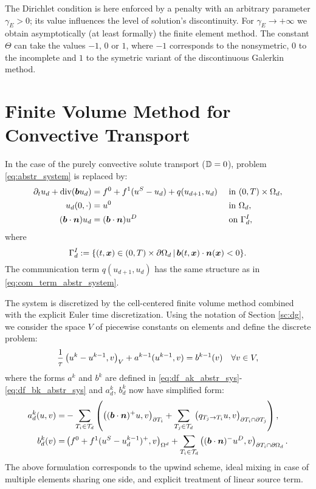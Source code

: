 The Dirichlet condition is here enforced by a penalty with an arbitrary parameter $\gamma_E>0$;
 its value influences the level of solution's discontinuity.
For $\gamma_E\to+\infty$ we obtain asymptotically (at least formally) the finite element method.
The constant $\Theta$ can take the values $-1$, $0$ or $1$,
 where $-1$ corresponds to the nonsymetric, $0$ to the incomplete and $1$ to the symetric variant of the discontinuous Galerkin method.




\section{Finite Volume Method for Convective Transport}

In the case of the purely convective solute transport ($\tn D=0$), problem \eqref{eq:abstr_system} is replaced by:
\begin{subequations}
 \label{eq:abstr_system_conv}
 \begin{align}
  \partial_t u_d + \div(\vc b u_d) &= f^0+f^1(u^S-u_d) + q(u_{d+1},u_d) &&\mbox{ in }(0,T)\times\Omega_d,\\
  u_d(0,\cdot) &= u^0 &&\mbox{ in }\Omega_d,\\
  \label{eq:bc_abstr_conc} (\vc b\cdot\vc n) u_d &= (\vc b\cdot\vc n) u^D &&\mbox{ on }\Gamma_d^I,
 \end{align}
\end{subequations}
 where
 \[ \Gamma_d^I:=\{(t,\vc x)\in(0,T)\times\partial\Omega_d\where \vc b(t,\vc x)\cdot\vc n(\vc x)<0\}. \]
 The communication term $q(u_{d+1},u_d)$ has the same structure as in \eqref{eq:com_term_abstr_system}.

The system is discretized by the cell-centered finite volume method combined with the explicit Euler time discretization.
Using the notation of Section \ref{sc:dg}, we consider the space $V$ of piecewise constants on elements and define the discrete problem:
\begin{equation*}
 \frac1\tau\sc{u^{k}-u^{k-1}}{v}_{V} + a^{k-1}(u^{k-1},v) = b^{k-1}(v) \quad \forall v\in V,
\end{equation*}
where the forms $a^k$ and $b^k$ are defined in \eqref{eq:df_ak_abstr_sys}-\eqref{eq:df_bk_abstr_sys} and $a^k_d$, $b^k_d$ now have simplified form:
\begin{align*}
 a^{k}_d(u,v) = & -\sum_{T_i\in\Td}\left(\sc{(\vc b\cdot\vc n)^+u}{v}_{\partial T_i} + \sum_{T_j\in\Td}\sc{q_{T_j\to T_i}u}{v}_{\partial T_i\cap\partial T_j} \right),\\
 b^{k}_d(v) = &\sc{f^0+f^1(u^S-u^{k-1}_d)^+}{v}_{\Omega^d} + \sum_{T_i\in\Td}\sc{(\vc b\cdot\vc n)^-u^D}{v}_{\partial T_i\cap\partial\Omega_d}.
\end{align*}
The above formulation corresponds to the upwind scheme, ideal mixing in case of multiple elements sharing one side, and explicit treatment of linear source term.

% 
